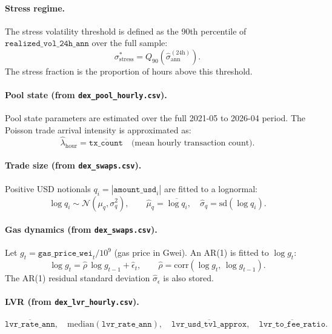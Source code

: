 \documentclass[11pt,a4paper]{article}
\begin{document}
\paragraph{Stress regime.}

The stress volatility threshold is defined as the 90th percentile of
$\texttt{realized\_vol\_24h\_ann}$ over the full sample:
\[
  \sigma^{*}_{\mathrm{stress}} =
  Q_{90}\!\left(\hat{\sigma}^{(24\mathrm{h})}_{\mathrm{ann}}\right).
\]
The stress fraction is the proportion of hours above this threshold.

\paragraph{Pool state (from \texttt{dex\_pool\_hourly.csv}).}

Pool state parameters are estimated over the full 2021-05 to 2026-04
period. The Poisson trade arrival intensity is approximated as:
\[
  \hat{\lambda}_{\mathrm{hour}} = \overline{\texttt{tx\_count}}
  \quad \text{(mean hourly transaction count)}.
\]

\paragraph{Trade size (from \texttt{dex\_swaps.csv}).}

Positive USD notionals $q_i = |\texttt{amount\_usd}_i|$ are fitted to
a lognormal:
\[
  \log q_i \sim \mathcal{N}(\mu_q, \sigma_q^2),
  \qquad
  \hat{\mu}_q = \overline{\log q_i},\quad
  \hat{\sigma}_q = \mathrm{sd}(\log q_i).
\]

\paragraph{Gas dynamics (from \texttt{dex\_swaps.csv}).}

Let $g_t = \texttt{gas\_price\_wei}_t / 10^9$ (gas price in Gwei).
An AR(1) is fitted to $\log g_t$:
\[
  \log g_t = \hat{\rho}\,\log g_{t-1} + \hat{\epsilon}_t,
  \qquad
  \hat{\rho} = \mathrm{corr}(\log g_t,\, \log g_{t-1}).
\]
The AR(1) residual standard deviation $\hat{\sigma}_\epsilon$ is
also stored.

\paragraph{LVR (from \texttt{dex\_lvr\_hourly.csv}).}

\[
  \overline{\texttt{lvr\_rate\_ann}},\quad
  \mathrm{median}(\texttt{lvr\_rate\_ann}),\quad
  \overline{\texttt{lvr\_usd\_tvl\_approx}},\quad
  \overline{\texttt{lvr\_to\_fee\_ratio}}.
\]
\end{document}
